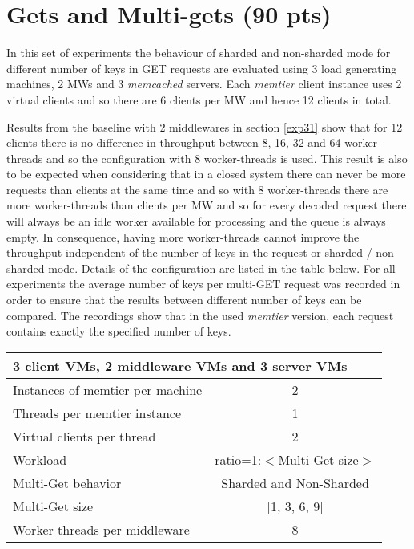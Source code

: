 \documentclass[report.tex]{subfiles}
\begin{document}
\section{Gets and Multi-gets (90 pts)}\label{exp5}


In this set of experiments the behaviour of sharded and non-sharded mode for different number of keys in GET requests are evaluated using 3 load generating machines, 2 MWs and 3 \emph{memcached} servers.
Each \emph{memtier} client instance uses 2 virtual clients and so there are 6 clients per MW and hence 12 clients in total. 

Results from the baseline with 2 middlewares in section \ref{exp31} show that for 12 clients there is no difference in throughput between 8, 16, 32 and 64 worker-threads and so the configuration with 8 worker-threads is used. This result is also to be expected when considering that in a closed system there can never be more requests than clients at the same time and so with 8 worker-threads there are more worker-threads than clients per MW and so for every decoded request there will always be an idle worker available for processing and the queue is always empty. In consequence, having more worker-threads cannot improve the throughput independent of the number of keys in the request or sharded / non-sharded mode.
Details of the configuration are listed in the table below.
For all experiments the average number of keys per multi-GET request was recorded in order to ensure that the results between different number of keys can be compared. The recordings show that in the used \emph{memtier} version, each request contains exactly the specified number of keys.

\begin{center}
	\scriptsize{
		\begin{tabular}{|l|c|}
			\multicolumn{2}{l}{3 client VMs, 2 middleware VMs and 3 server VMs}\\
			\hline Instances of memtier per machine & 2                       \\ 
			\hline Threads per memtier instance     & 1                       \\
			\hline Virtual clients per thread       & 2     		           \\ 
			\hline Workload                         & ratio=1:$<$Multi-Get size$>$         \\
			\hline Multi-Get behavior               & Sharded and Non-Sharded  \\
			\hline Multi-Get size                   & [1, 3, 6, 9]            \\
			\hline Worker threads per middleware    & 8 \\
			\hline 
		\end{tabular}
	} 
\end{center}
\end{document}
